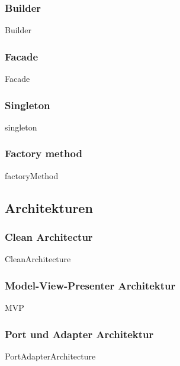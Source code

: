 \documentclass{article}
\begin{document}
        \subsubsection{Builder}
        \label{kap:gof:builder}
            {Builder}

        \subsubsection{Facade}
        \label{kap:gof:facade}
            {Facade}

        \subsubsection{Singleton}
        \label{kap:gof:singleton}
            {singleton}

        \subsubsection{Factory method}
        \label{kap:gof:factory}
            {factoryMethod}
            

    \subsection{Architekturen}
        \subsubsection{Clean Architectur}
            {CleanArchitecture}
        \newpage
        \subsubsection{Model-View-Presenter Architektur}
        \label{kap:MVP}
            {MVP}
        
        \newpage
        \subsubsection{Port und Adapter Architektur}
        \label{kap:PortAdapterArchitecture}
            {PortAdapterArchitecture}
\end{document}
